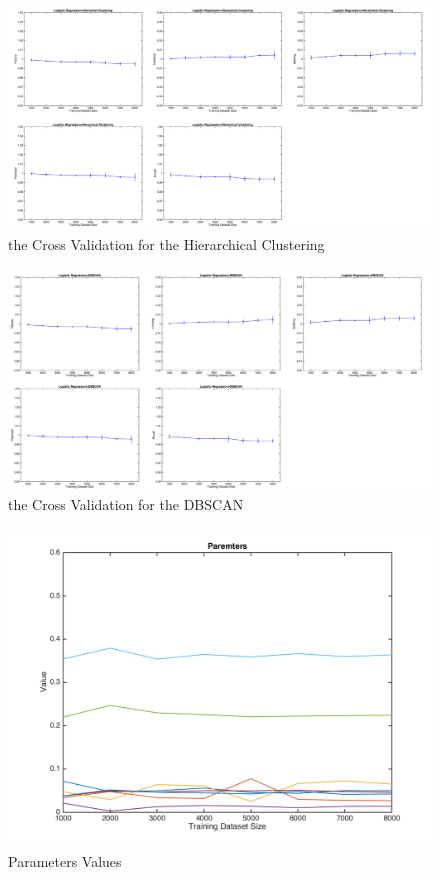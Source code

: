 \begin{figure}
\centering
\includegraphics[scale=0.23]{CVHi.pdf}
\caption{the Cross Validation for the Hierarchical Clustering}
\end{figure}
\begin{figure} 
\centering
\includegraphics[scale=0.23]{CVDB.pdf}
\caption{the Cross Validation for the DBSCAN}
\end{figure}


\begin{figure}
\centering
\includegraphics[scale=0.5]{parameters.png}
\caption{Parameters Values}
\end{figure}


